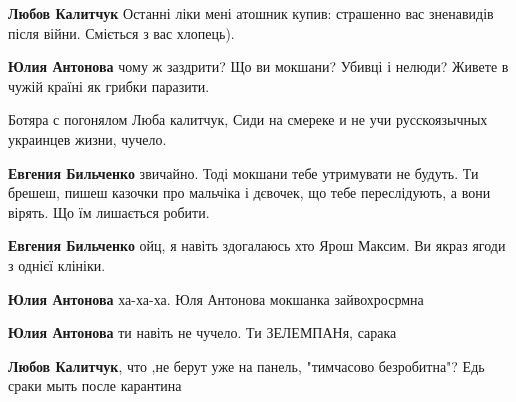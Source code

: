 \begin{itemize}
\begin{itemize}
\textbf{Любов Калитчук} Останні ліки мені атошник купив: страшенно вас зненавидів після війни. Сміється з вас хлопець).

 
\textbf{Юлия Антонова} чому ж заздрити? Що ви мокшани? Убивці і нелюди?
Живете в чужій країні як грибки паразити.

 
Ботяра с погонялом Люба калитчук, Сиди на смереке и не учи русскоязычных украинцев жизни, чучело.

 
\textbf{Евгения Бильченко} звичайно. Тоді мокшани тебе утримувати не будуть. Ти брешеш, пишеш казочки про мальчіка і дєвочек, що тебе переслідують, а вони вірять. Що їм лишається робити.

 
\textbf{Евгения Бильченко} ойц, я навіть здогалаюсь хто Ярош Максим. Ви якраз ягоди з однієї клініки.

 
\textbf{Юлия Антонова} ха-ха-ха. Юля Антонова мокшанка зайвохросрмна

 
\textbf{Юлия Антонова} ти навіть не чучело. Ти ЗЕЛЕМПАНя, сарака

 
\textbf{Любов Калитчук}, что ,не берут уже на панель, "тимчасово безробитна"? Едь сраки мыть после карантина


\end{itemize}
\end{itemize}
